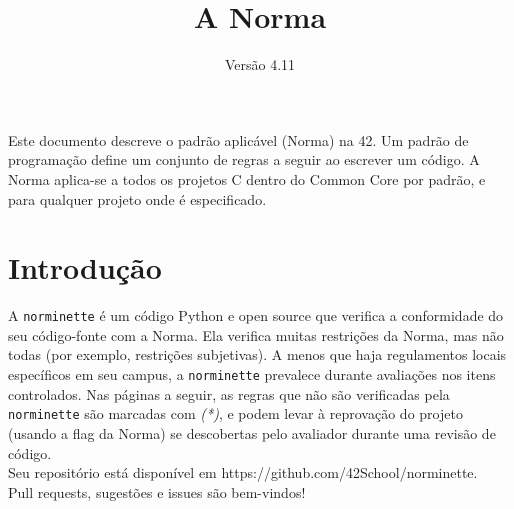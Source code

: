 \documentclass{42-pt}
\begin{document}
\title{A Norma}
\subtitle{Versão 4.11}

\summary
{
    Este documento descreve o padrão aplicável (Norma) na 42. Um padrão de
	programação define um conjunto de regras a seguir ao escrever um código.
    A Norma aplica-se a todos os projetos C dentro do Common Core por padrão, e
    para qualquer projeto onde é especificado.
}

\maketitle

\tableofcontents



\chapter{Introdução}

A \texttt{norminette} é um código Python e open source que verifica a conformidade
do seu código-fonte com a Norma. Ela verifica muitas restrições da Norma, mas
não todas (por exemplo, restrições subjetivas). A menos que haja regulamentos
locais específicos em seu campus, a \texttt{norminette} prevalece durante
avaliações nos itens controlados. Nas páginas a seguir, as regras que não são
verificadas pela \texttt{norminette} são marcadas com \textit{(*)}, e podem levar
à reprovação do projeto (usando a flag da Norma) se descobertas pelo
avaliador durante uma revisão de código.\\

Seu repositório está disponível em https://github.com/42School/norminette.\\

Pull requests, sugestões e issues são bem-vindos!

\newpage


\end{document}
